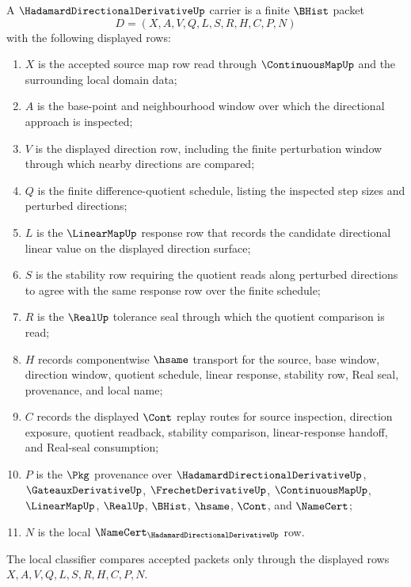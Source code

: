 \begin{definition}
\label{def:hadamard-directional-derivative-carrier}
A $\HadamardDirectionalDerivativeUp$ carrier is a finite $\BHist$ packet
$$
D=(X,A,V,Q,L,S,R,H,C,P,N)
$$
with the following displayed rows:
\begin{enumerate}
\item $X$ is the accepted source map row read through $\ContinuousMapUp$ and the surrounding local domain data;
\item $A$ is the base-point and neighbourhood window over which the directional approach is inspected;
\item $V$ is the displayed direction row, including the finite perturbation window through which nearby directions are compared;
\item $Q$ is the finite difference-quotient schedule, listing the inspected step sizes and perturbed directions;
\item $L$ is the $\LinearMapUp$ response row that records the candidate directional linear value on the displayed direction surface;
\item $S$ is the stability row requiring the quotient reads along perturbed directions to agree with the same response row over the finite schedule;
\item $R$ is the $\RealUp$ tolerance seal through which the quotient comparison is read;
\item $H$ records componentwise $\hsame$ transport for the source, base window, direction window, quotient schedule, linear response, stability row, Real seal, provenance, and local name;
\item $C$ records the displayed $\Cont$ replay routes for source inspection, direction exposure, quotient readback, stability comparison, linear-response handoff, and Real-seal consumption;
\item $P$ is the $\Pkg$ provenance over $\HadamardDirectionalDerivativeUp$, $\GateauxDerivativeUp$, $\FrechetDerivativeUp$, $\ContinuousMapUp$, $\LinearMapUp$, $\RealUp$, $\BHist$, $\hsame$, $\Cont$, and $\NameCert$;
\item $N$ is the local $\NameCert_{\HadamardDirectionalDerivativeUp}$ row.
\end{enumerate}
The local classifier compares accepted packets only through the displayed rows $X,A,V,Q,L,S,R,H,C,P,N$.
\end{definition}

